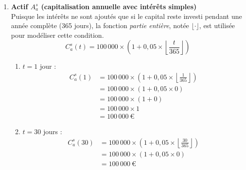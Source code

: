 \documentclass{article}
\begin{document}
\begin{enumerate}[label=\textbf{R1.\arabic*}]
\begin{enumerate}[label=(\alph*)]
          \end{enumerate}
          
    \item \textbf{Actif \( A_a^s \) (capitalisation annuelle avec intérêts simples)} \\
          Puisque les intérêts ne sont ajoutés que si le capital reste investi pendant une année complète (365 jours), la fonction \emph{partie entière}, notée $\lfloor \cdot \rfloor$, est utilisée pour modéliser cette condition.
          \[
              C_a^s(t) = 100\,000 \times \left(1 + 0,05 \times \left\lfloor \frac{t}{365} \right\rfloor \right)
          \]
          \begin{enumerate}[label=(\alph*)]
              \item \( t = 1 \) jour : 
                    \begin{align*}
                        C_a^s(1) & = 100\,000 \times \left(1 + 0,05 \times \left\lfloor \frac{1}{365} \right\rfloor \right) \\
                                 & = 100\,000 \times \left(1 + 0,05 \times 0 \right)                                        \\
                                 & = 100\,000 \times (1 + 0)                                                                \\
                                 & = 100\,000 \times 1                                                                      \\
                                 & = \boxed{100\,000\ \text{€}}                                                           
                    \end{align*}
                            
              \item \( t = 30 \) jours : 
                    \begin{align*}
                        C_a^s(30) & = 100\,000 \times \left(1 + 0,05 \times \left\lfloor \frac{30}{365} \right\rfloor \right) \\
                                  & = 100\,000 \times \left(1 + 0,05 \times 0 \right)                                         \\
                                  & = \boxed{100\,000\ \text{€}}                                                            
                    \end{align*}
                            

\end{enumerate}
\end{enumerate}
\end{document}
